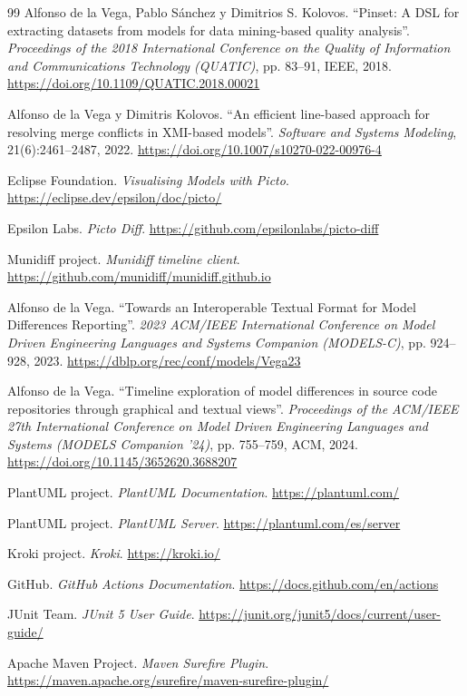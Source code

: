 \documentclass[11pt]{article}
\begin{document}
\begin{thebibliography}{99}
Alfonso de la Vega, Pablo Sánchez y Dimitrios S. Kolovos.
``Pinset: A DSL for extracting datasets from models for data mining-based quality analysis''.
\textit{Proceedings of the 2018 International Conference on the Quality of Information and Communications Technology (QUATIC)}, pp. 83--91, IEEE, 2018.
\url{https://doi.org/10.1109/QUATIC.2018.00021}

Alfonso de la Vega y Dimitris Kolovos.
``An efficient line-based approach for resolving merge conflicts in XMI-based models''.
\textit{Software and Systems Modeling}, 21(6):2461--2487, 2022.
\url{https://doi.org/10.1007/s10270-022-00976-4}

Eclipse Foundation.
\textit{Visualising Models with Picto}.
\url{https://eclipse.dev/epsilon/doc/picto/}

Epsilon Labs.
\textit{Picto Diff}.
\url{https://github.com/epsilonlabs/picto-diff}

Munidiff project.
\textit{Munidiff timeline client}.
\url{https://github.com/munidiff/munidiff.github.io}

Alfonso de la Vega.
``Towards an Interoperable Textual Format for Model Differences Reporting''.
\textit{2023 ACM/IEEE International Conference on Model Driven Engineering Languages and Systems Companion (MODELS-C)}, pp. 924--928, 2023.
\url{https://dblp.org/rec/conf/models/Vega23}

Alfonso de la Vega.
``Timeline exploration of model differences in source code repositories through graphical and textual views''.
\textit{Proceedings of the ACM/IEEE 27th International Conference on Model Driven Engineering Languages and Systems (MODELS Companion '24)}, pp. 755--759, ACM, 2024.
\url{https://doi.org/10.1145/3652620.3688207}

PlantUML project.
\textit{PlantUML Documentation}.
\url{https://plantuml.com/}

PlantUML project.
\textit{PlantUML Server}.
\url{https://plantuml.com/es/server}

Kroki project.
\textit{Kroki}.
\url{https://kroki.io/}

GitHub.
\textit{GitHub Actions Documentation}.
\url{https://docs.github.com/en/actions}

JUnit Team.
\textit{JUnit 5 User Guide}.
\url{https://junit.org/junit5/docs/current/user-guide/}

Apache Maven Project.
\textit{Maven Surefire Plugin}.
\url{https://maven.apache.org/surefire/maven-surefire-plugin/}

\end{thebibliography}
\end{document}
